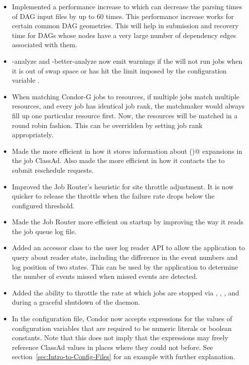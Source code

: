 \begin{itemize}

\item Implemented a performance increase to  which can
decrease the parsing times of DAG input files by up to 60 times.
This performance increase works for certain common DAG geometries.
This will help in submission and recovery
time for DAGs whose nodes have a very large number of dependency edges
associated with them.

\item {} -analyze and -better-analyze now emit warnings
if the  will not run jobs when it is out of swap space or
has hit the limit imposed by the configuration variable
.

\item When matching Condor-G jobs to resources, if multiple jobs
match multiple resources, and every job has identical job rank, the
matchmaker would always fill up one particular resource first.  Now,
the resources will be matched in a round robin fashion.  This can be
overridden by setting job rank appropriately.

\item Made the  more efficient in how it stores
information about \verb@$$()@ expansions in the job ClassAd.
Also made the  more efficient in how it contacts
the  to submit reschedule requests.

\item Improved the Job Router's heuristic for site throttle adjustment.  It
is now quicker to release the throttle when the failure rate drops
below the configured threshold.

\item Made the Job Router more efficient on startup by improving the way it
reads the job queue log file.

\item Added an accessor class to the user log reader API to allow the
  application to query about reader state, including the
  difference in the event numbers and log position of two states.  This
  can be used by the application to determine the number of events
  missed when missed events are detected.

\item Added the ability to throttle the rate at which jobs are
stopped via , , ,
and during a graceful shutdown of the  daemon.

\item In the configuration file, Condor now accepts expressions for
the values of configuration variables that are required to be 
numeric literals or boolean constants.  
Note that this does not imply that the
expressions may freely reference ClassAd values in places where they
could not before.  
See section~\ref{sec:Intro-to-Config-Files} for an example with
further explanation.

\end{itemize}

